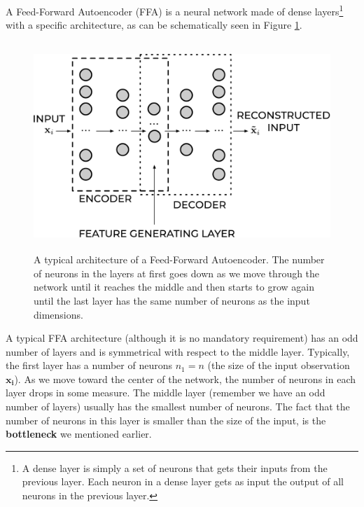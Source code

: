 \documentclass[12pt,a4]{article}
\begin{document}
A Feed-Forward Autoencoder (FFA) is a neural network made of dense layers\footnote{ A dense layer is simply a set of neurons that gets their inputs from the previous layer. Each neuron in a dense layer gets as input the output of all neurons in the previous layer.} with a specific architecture, as can be schematically seen in Figure \ref{fig:arch2}.
\begin{figure}[hbt]
\label{fig:arch2}
\centering
\includegraphics[width=12.6cm,height=7.85cm]{./images/image4.pdf}
\caption{A typical architecture of a Feed-Forward Autoencoder. The number of neurons in the layers at first goes down as we move through the network until it reaches the middle and then starts to grow again until the last layer has the same number of neurons as the input dimensions.}
\end{figure}


A typical FFA architecture (although it is no mandatory requirement) has an odd number of layers and is symmetrical with respect to the middle layer. Typically, the first layer has a number of neurons \( n_{1} = n\) (the size of the input observation \(\mathbf{x}_{\mathbf{i}}\)). As we move toward the center of the network, the number of neurons in each layer drops in some measure. The middle layer (remember we have an odd number of layers) usually has the smallest number of neurons. The fact that the number of neurons in this layer is smaller than the size of the input, is the \textbf{bottleneck} we mentioned earlier. 
\end{document}
